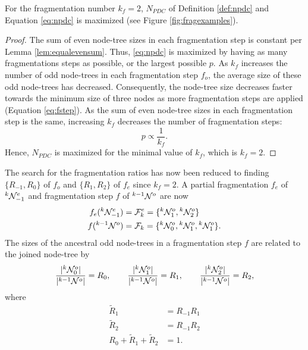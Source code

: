 \begin{theorem}\label{the:fragnumber}
  For the fragmentation number $k_f=2$, $N_{PDC}$ of Definition \ref{def:npdc} and Equation \eqref{eq:npdc} is maximized (see Figure \ref{fig:fragexamples}).
\end{theorem}
\begin{proof}
  The sum of even node-tree sizes in each fragmentation step is constant per Lemma \ref{lem:equalevensum}. Thus, \eqref{eq:npdc} is maximized by having as many fragmentations steps as possible, or the largest possible $p$.  As $k_f$ increases the number of odd node-trees in each fragmentation step $f_o$, the average size of these odd node-trees has decreased. Consequently, the node-tree size decreases faster towards the minimum size of three nodes as more fragmentation steps are applied (Equation \eqref{eq:fstep}). As the sum of even node-tree sizes in each fragmentation step is the same, increasing $k_f$ decreases the number of fragmentation steps:
  \begin{equation}
    p \propto \frac{1}{k_f}.
  \end{equation}
  Hence, $N_{PDC}$ is maximized for the minimal value of $k_f$, which is $k_f = 2$.
\end{proof}

% 

The search for the fragmentation ratios has now been reduced to finding $\{R_{-1}, R_0\}$ of $f_o$ and $\{R_1, R_2\}$ of $f_e$ since $k_f = 2$. A partial fragmentation $f_e$ of ${}^{k}\mathcal{N}^e_{-1}$ and fragmentation step $f$ of ${}^{k-1}\mathcal{N}^o$ are now
\begin{align}
  f_e(\pre{k}\nset^e_{-1}) & = \m{F}^e_k  =\{\pre{k}\nset^{o}_1,\pre{k}\nset^o_2\} \label{eq:newpfe}                      \\
  f(\pre{k-1}\nset^o)      & = \m{F}_k    = \{\pre{k}\nset^o_0, \pre{k}\nset^o_1, \pre{k}\nset^o_1\}. \label{eq:newfstep}
\end{align}
The sizes of the ancestral odd node-trees in a fragmentation step $f$ are related to the joined node-tree by
\begin{equation}
  \frac{\lvert{}^{k}\mathcal{N}^o_0\rvert}{\lvert{}^{k-1}\mathcal{N}^o\rvert} = R_0, \hspace{2em}
  \frac{\lvert{}^{k}\mathcal{N}^o_1\rvert}{\lvert{}^{k-1}\mathcal{N}^o\rvert} = R_1, \hspace{2em}
  \frac{\lvert{}^{k}\mathcal{N}^o_2\rvert}{\lvert{}^{k-1}\mathcal{N}^o\rvert} = R_2,
\end{equation}
where
\begin{align}
  \nonumber  \tilde{R}_1                     & = R_{-1}R_1                      \\
  \tilde{R}_2                                & = R_{-1}R_2 \label{eq:bigratios} \\
  \nonumber  R_0 + \tilde{R}_1 + \tilde{R}_2 & = 1.
\end{align}

